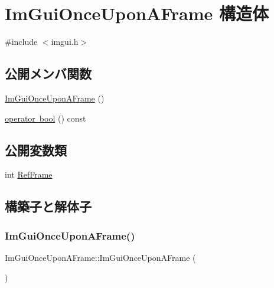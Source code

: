 \hypertarget{struct_im_gui_once_upon_a_frame}{}\section{Im\+Gui\+Once\+Upon\+A\+Frame 構造体}
\label{struct_im_gui_once_upon_a_frame}


{\ttfamily \#include $<$imgui.\+h$>$}

\subsection*{公開メンバ関数}
\begin{DoxyCompactItemize}
\item 
\mbox{\hyperlink{struct_im_gui_once_upon_a_frame_ac9513f72a884f6fe844869b157b23f1f}{Im\+Gui\+Once\+Upon\+A\+Frame}} ()
\item 
\mbox{\hyperlink{struct_im_gui_once_upon_a_frame_a3c912b79bc333ce746356001431c2504}{operator bool}} () const
\end{DoxyCompactItemize}
\subsection*{公開変数類}
\begin{DoxyCompactItemize}
\item 
int \mbox{\hyperlink{struct_im_gui_once_upon_a_frame_a2d44776b8e7bdeec217f88be9f832e08}{Ref\+Frame}}
\end{DoxyCompactItemize}


\subsection{構築子と解体子}
\mbox{\label{struct_im_gui_once_upon_a_frame_ac9513f72a884f6fe844869b157b23f1f}} 
\subsubsection{\texorpdfstring{Im\+Gui\+Once\+Upon\+A\+Frame()}{ImGuiOnceUponAFrame()}}
{\footnotesize\ttfamily Im\+Gui\+Once\+Upon\+A\+Frame\+::\+Im\+Gui\+Once\+Upon\+A\+Frame (\begin{DoxyParamCaption}{ }\end{DoxyParamCaption})\hspace{0.3cm}{\ttfamily [inline]}}



